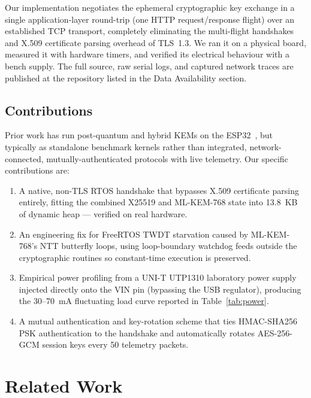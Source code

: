 \documentclass[journal, 10pt]{IEEEtran}
\begin{document}
Our implementation negotiates the ephemeral cryptographic key exchange in a single application-layer round-trip (one HTTP request/response flight) over an established TCP transport, completely eliminating the multi-flight handshakes and X.509 certificate parsing overhead of TLS~1.3. We ran it on a physical board, measured it with hardware timers, and verified its electrical behaviour with a bench supply. The full source, raw serial logs, and captured network traces are published at the repository listed in the Data Availability section.

\subsection{Contributions}
Prior work has run post-quantum and hybrid KEMs on the ESP32~\cite{b11,b6,b12,b14}, but typically as standalone benchmark kernels rather than integrated, network-connected, mutually-authenticated protocols with live telemetry. Our specific contributions are:
\begin{enumerate}
    \item A native, non-TLS RTOS handshake that bypasses X.509 certificate parsing entirely, fitting the combined X25519 and ML-KEM-768 state into 13.8~KB of dynamic heap — verified on real hardware.
    \item An engineering fix for FreeRTOS TWDT starvation caused by ML-KEM-768's NTT butterfly loops, using loop-boundary watchdog feeds outside the cryptographic routines so constant-time execution is preserved.
    \item Empirical power profiling from a UNI-T UTP1310 laboratory power supply injected directly onto the VIN pin (bypassing the USB regulator), producing the 30--70~mA fluctuating load curve reported in Table~\ref{tab:power}.
    \item A mutual authentication and key-rotation scheme that ties HMAC-SHA256 PSK authentication to the handshake and automatically rotates AES-256-GCM session keys every 50 telemetry packets.
\end{enumerate}

\section{Related Work}
\end{document}
